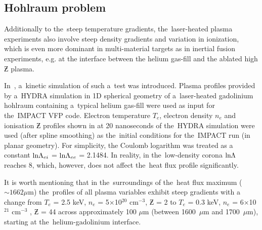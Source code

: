 \subsection{Hohlraum problem}
Additionally to the~steep temperature gradients, the~laser-heated plasma 
experiments also involve steep density gradients and variation in ionization,
which is even more dominant in multi-material targets as in inertial
fusion experiments, e.g. at the interface between the helium gas-fill and 
the ablated high $\Zbar$ plasma.

In~\cite{Brodrick_PoP2017}, a~kinetic simulation of such a~test was introduced.
Plasma profiles provided by a~HYDRA simulation in 1D spherical
geometry of a~laser-heated gadolinium hohlraum containing a~typical helium 
gas-fill were used as input for the~IMPACT \cite{Kingham_JCP2004} VFP code. 
Electron temperature $T_e$, electron density $n_e$ and ionisation $\Zbar$ 
profiles shown in  at 20 nanoseconds of 
the~HYDRA simulation were used (after spline smoothing) as 
the~initial conditions for the~IMPACT run (in planar geometry). 
For simplicity, the Coulomb logarithm was treated as a
constant $\text{ln}\Lambda_{ei}$ = $\text{ln}\Lambda_{ee}$ = 2.1484. In reality, in the~low-density 
corona $\text{ln}\Lambda$ reaches 8, which, however, does not affect the~heat flux profile 
significantly. 

It is worth mentioning that in the~surroundings of the~heat flux maximum 
($\sim 1662 \mu$m) the~profiles of all plasma variables exhibit steep gradients 
with a change from $T_e$ = 2.5 keV, $n_e$ = 5$\times$10$^{20}$ cm$^{−3}$, 
$\Zbar$ = 2 to $T_e$ = 0.3 keV, $n_e$ = 6$\times$10$^{21}$ cm$^{−3}$ , 
$\Zbar$ = 44 across approximately 100 $\mu$m 
(between 1600~$\mu$m and 1700~$\mu$m), starting at the~helium-gadolinium 
interface.  


